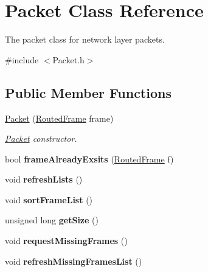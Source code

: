 \hypertarget{classPacket}{\section{Packet Class Reference}
\label{classPacket}
}


The packet class for network layer packets.  




{\ttfamily \#include $<$Packet.\-h$>$}

\subsection*{Public Member Functions}
\begin{DoxyCompactItemize}
\item 
\hyperlink{classPacket_ac9c69d1e86e52f896ba5392b57baa7f6}{Packet} (\hyperlink{classRoutedFrame}{Routed\-Frame} frame)
\begin{DoxyCompactList}\small\item\em \hyperlink{classPacket}{Packet} constructor. \end{DoxyCompactList}\item 
\hypertarget{classPacket_ad70f0a6e94787200b33a651f559aeaab}{bool {\bfseries frame\-Already\-Exsits} (\hyperlink{classRoutedFrame}{Routed\-Frame} f)}\label{classPacket_ad70f0a6e94787200b33a651f559aeaab}

\item 
\hypertarget{classPacket_acc003fd8ca771e7c76689871138f4d51}{void {\bfseries refresh\-Lists} ()}\label{classPacket_acc003fd8ca771e7c76689871138f4d51}

\item 
\hypertarget{classPacket_a44ae78eb4f5acef68fdbe61d357d1956}{void {\bfseries sort\-Frame\-List} ()}\label{classPacket_a44ae78eb4f5acef68fdbe61d357d1956}

\item 
\hypertarget{classPacket_a94ff1e02094fcf7c4227610415b60352}{unsigned long {\bfseries get\-Size} ()}\label{classPacket_a94ff1e02094fcf7c4227610415b60352}

\item 
\hypertarget{classPacket_acb764ed00dc608bf08e0b6fa1e1406fa}{void {\bfseries request\-Missing\-Frames} ()}\label{classPacket_acb764ed00dc608bf08e0b6fa1e1406fa}

\item 
\hypertarget{classPacket_a8d2267ee0e2e29c14a474e11b0f504c4}{void {\bfseries refresh\-Missing\-Frames\-List} ()}\label{classPacket_a8d2267ee0e2e29c14a474e11b0f504c4}


\end{DoxyCompactItemize}
